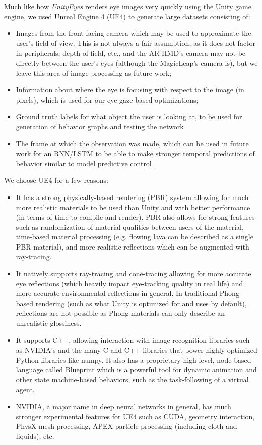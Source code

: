 Much like how \emph{UnityEyes} \cite{???} renders eye images very quickly using the Unity game engine, we used Unreal Engine 4 (UE4) to generate large datasets consisting of:
\begin{itemize}
\item Images from the front-facing camera which may be used to approximate the user's field of view. This is not always a fair assumption, as it does not factor in peripherals, depth-of-field, etc., and the AR HMD's camera may not be directly between the user's eyes (although the MagicLeap's camera is), but we leave this area of image processing as future work; 
\item Information about where the eye is focusing with respect to the image (in pixels), which is used for our eye-gaze-based optimizations;
\item Ground truth labels for what object the user is looking at, to be used for generation of behavior graphs and testing the network
\item The frame at which the observation was made, which can be used in future work for an RNN/LSTM to be able to make stronger temporal predictions of behavior similar to model predictive control \cite{???}.
\end{itemize}
We choose UE4 for a few reasons:
\begin{itemize}
    \item
        It has a strong physically-based rendering (PBR) system allowing for
        much more realistic materials to be used than Unity and with better
        performance (in terms of time-to-compile and render). PBR also allows for strong features such as randomization of material qualities between users of the material, time-based material processing (e.g. flowing lava can be described as a single PBR material), and more realistic reflections which can be augmented with ray-tracing.
    \item
        It natively supports ray-tracing and cone-tracing allowing for more
        accurate eye reflections (which heavily impact eye-tracking quality in
        real life) and more accurate environmental reflections in general. In traditional Phong-based rendering (such as what Unity is optimized for and uses by default), reflections are not possible as Phong materials can only describe an unrealistic glossiness.
    \item
        It supports C++, allowing interaction with image recognition libraries
        such as NVIDIA's and the many C and C++ libraries that power highly-optimized Python libraries like numpy. It also has a proprietary high-level, node-based language called Blueprint which is a powerful tool for dynamic animation and other state machine-based behaviors, such as the task-following of a virtual agent.
    \item
        NVIDIA, a major name in deep neural networks in general, has much
        stronger experimental features for UE4 such as CUDA, geometry
        interaction, PhysX mesh processing, APEX particle processing (including cloth and liquids), etc.
\end{itemize}

